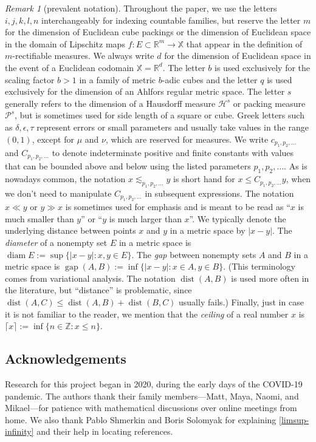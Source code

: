 \documentclass[12pt]{amsart}
\theoremstyle{definition}
\theoremstyle{remark}
\newtheorem{remark}[theorem]{Remark}
\newcommand{\RR}{\mathbb{R}}
\newcommand{\ZZ}{\mathbb{Z}}
\newcommand{\XX}{\mathbb{X}}
\newcommand{\Haus}{\mathcal{H}}
\newcommand{\Pack}{\mathcal{P}}
\newcommand{\dist}{\mathop\mathrm{dist}\nolimits}
\newcommand{\diam}{\mathop\mathrm{diam}\nolimits}
\newcommand{\gap}{\mathop\mathrm{gap}\nolimits}
\numberwithin{figure}{section}
\numberwithin{equation}{section}
\begin{document}
\begin{remark}[prevalent notation] Throughout the paper, we use the letters $i,j,k,l,n$ interchangeably for indexing countable families, but reserve the letter $m$ for the dimension of Euclidean cube packings or the dimension of Euclidean space in the domain of Lipschitz maps $f:E\subset\RR^m\rightarrow\XX$ that appear in the definition of $m$-rectifiable measures. We always write $d$ for the dimension of Euclidean space in the event of a Euclidean codomain $\XX=\RR^d$. The letter $b$ is used exclusively for the scaling factor $b>1$ in a family of metric $b$-adic cubes and the letter $q$ is used exclusively for the dimension of an Ahlfors regular metric space. The letter $s$ generally refers to the dimension of a Hausdorff measure $\Haus^s$ or packing measure $\Pack^s$, but is sometimes used for side length of a square or cube. Greek letters such as $\delta,\epsilon,\tau$ represent errors or small parameters and usually take values in the range $(0,1)$, except for $\mu$ and $\nu$, which are reserved for measures. We write $c_{p_1,p_2,\dots}$ and $C_{p_1,p_2,\dots}$ to denote indeterminate positive and finite constants with values that can be bounded above and below using the listed parameters $p_1,p_2,\dots$. As is nowadays common, the notation $x\lesssim_{p_1,p_2,\dots} y$ is short hand for $x\leq C_{p_1,p_2,\dots} y$, when we don't need to manipulate $C_{p_1,p_2,\dots}$ in subsequent expressions. The notation $x\ll y$ or $y\gg x$ is sometimes used for emphasis and is meant to be read as ``$x$ is much smaller than $y$'' or ``$y$ is much larger than $x$''. We typically denote the underlying distance between points $x$ and $y$ in a metric space by $|x-y|$. The \emph{diameter} of a nonempty set $E$ in a metric space is $\diam E:=\sup\{|x-y|:x,y\in E\}$. The \emph{gap} between nonempty sets $A$ and $B$ in a metric space is $\gap(A,B):=\inf\{|x-y|:x\in A,y\in B\}$. (This terminology comes from variational analysis. The notation $\dist(A,B)$ is used more often in the literature, but ``distance'' is problematic, since $\dist(A,C)\leq \dist(A,B)+\dist(B,C)$ usually fails.) Finally, just in case it is not familiar to the reader, we mention that the \emph{ceiling} of a real number $x$ is $\lceil x\rceil := \inf\{n\in\ZZ:x\leq n\}$. \end{remark}

\subsection*{Acknowledgements} Research for this project began in 2020, during the early days of the COVID-19 pandemic. The authors thank their family members---Matt, Maya, Naomi, and Mikael---for patience with mathematical discussions over online meetings from home. We also thank Pablo Shmerkin and Boris Solomyak for explaining \eqref{limsup-infinity} and their help in locating references.
\end{document}
